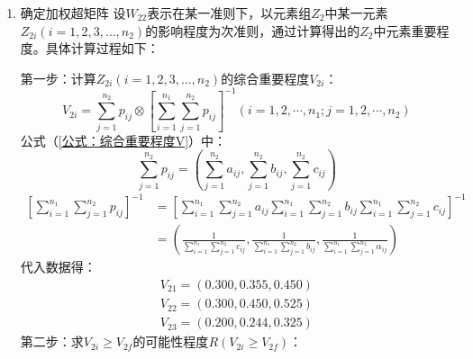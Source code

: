 \documentclass[withoutpreface,bwprint]{cumcmthesis}
\begin{document}
\begin{enumerate}
\begin{equation*}
\begin{array}{ccc}
                                (0.1,0.2,0.2) & (0.4,0.4,0.6) & (0.5,0.5,0.5)
                            \end{array}\right]
                        \end{equation*}
                \item 确定加权超矩阵
                      设$W_{22}$表示在某一准则下，以元素组$Z_2$中某一元素$Z_{2i}(i = 1, 2, 3, \dots, n_2)$的影响程度为次准则，通过计算得出的$Z_2$中元素重要程度。具体计算过程如下：\par
                      第一步：计算$Z_{2i}(i = 1, 2, 3, \dots, n_2)$的综合重要程度$V_{2i}$：
                      \begin{equation}
                        V_{2i} = \sum_{j=1}^{n_2} p_{i j} \otimes\left[\sum_{i=1}^{n_1} \sum_{j=1}^{n_2} p_{i j}\right]^{-1}\left(i=1,2, \cdots, n_{1} ; j=1,2, \cdots, n_{2}\right)
                        \label {公式：综合重要程度V}
                      \end{equation}
                      \phantom{第一步：}公式（\ref{公式：综合重要程度V}）中：
                      \begin{equation*}
                        \sum_{j=1}^{n_{2}} p_{i j}=\left(\sum_{j=1}^{n_{2}} a_{i j}, \sum_{j=1}^{n_{2}} b_{i j}, \sum_{j=1}^{n_{2}} c_{i j}\right)
                      \end{equation*}
                      \begin{align*}
                        \left[\sum_{i=1}^{n_{1}} \sum_{j=1}^{n_2} p_{i j}\right]^{-1} &= \left[\sum_{i=1}^{n_{1}} \sum_{j=1}^{n_{2}} a_{i j} \sum_{i=1}^{n_{1}} \sum_{j=1}^{n_{2}} b_{i j} \sum_{i=1}^{n_{1}} \sum_{j=1}^{n_{2}} c_{i j}\right]^{-1}\\
                        &= \left(\frac{1}{\sum_{i=1}^{n_{1}} \sum_{j=1}^{n_{2}} c_{i j}}, \frac{1}{\sum_{i=1}^{n_{1}} \sum_{j=1}^{n_{2}} b_{i j}}, \frac{1}{\sum_{i=1}^{n_{1}} \sum_{j=1}^{n_{2}} \alpha_{i j}}\right)
                      \end{align*}
                      \phantom{第一步：}代入数据得：
                      \begin{align*}
                          V_{21} = (0.300, 0.355, 0.450)\\
                          V_{22} = (0.300, 0.450, 0.525)\\
                          V_{23} = (0.200, 0.244, 0.325)
                      \end{align*}
                      第二步：求$V_{2i} \geq V_{2f}$的可能性程度$R(V_{2i} \geq V_{2f})$：

\end{enumerate}
\end{document}
